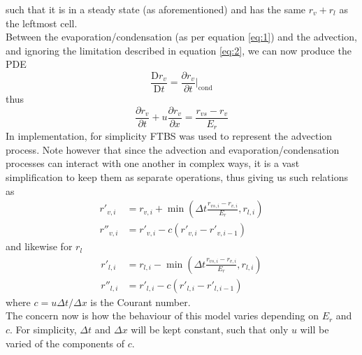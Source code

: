 \documentclass[11pt]{article}
\begin{document}
such that it is in a steady state (as aforementioned) and has the same $r_v+r_l$ as the leftmost cell. \\
Between the evaporation/condensation (as per equation \ref{eq:1}) and the advection, and ignoring the limitation described in equation \ref{eq:2}, we can now produce the PDE
\[
\frac{\text{D} r_v}{\text{D} t}=\frac{\partial r_v}{\partial t}|_{\text{cond}}
\]
thus
\begin{equation} \label{eq:3}
\frac{\partial r_v}{\partial t}+u\frac{\partial r_v}{\partial x}=\frac{r_{vs} - r_v}{E_r}
\end{equation}
In implementation, for simplicity FTBS was used to represent the advection process. Note however that since the advection and evaporation/condensation processes can interact with one another in complex ways, it is a vast simplification to keep them as separate operations, thus giving us such relations as
\begin{align} \label{eq:4}
r'_{v,i} &= r_{v,i} + \min\left(\Delta t\frac{r_{vs,i} - r_{v,i}}{E_r},r_{l,i}\right) \\ \label{eq:5}
r''_{v,i} &= r'_{v,i} - c\left(r'_{v,i} - r'_{v,i-1}\right)
\end{align}
and likewise for $r_l$
\begin{align} \label{eq:6}
r'_{l,i} &= r_{l,i} - \min\left(\Delta t\frac{r_{vs,i} - r_{v,i}}{E_r},r_{l,i}\right) \\ \label{eq:7}
r''_{l,i} &= r'_{l,i} - c\left(r'_{l,i} - r'_{l,i-1}\right)
\end{align}
where $c=u \Delta t/\Delta x$ is the Courant number. \\
The concern now is how the behaviour of this model varies depending on $E_r$ and $c$. For simplicity, $\Delta t$ and $\Delta x$ will be kept constant, such that only $u$ will be varied of the components of $c$.
\end{document}
